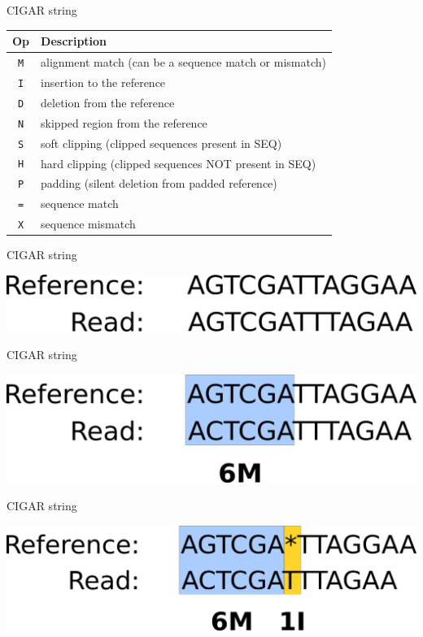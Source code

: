 \documentclass{beamer}
\begin{document}
\begin{frame}{CIGAR string}
  \begin{tabular}{cl}
  \hline
  Op & Description\\
  \hline
  {\tt M} & alignment match (can be a sequence match or mismatch)\\
  {\tt I} & insertion to the reference \\
  {\tt D} & deletion from the reference \\
  {\tt N} & skipped region from the reference \\
  {\tt S} & soft clipping (clipped sequences present in {\sf SEQ})\\
  {\tt H} & hard clipping (clipped sequences NOT present in {\sf SEQ})\\
  {\tt P} & padding (silent deletion from padded reference)\\
  {\tt =} & sequence match \\
  {\tt X} & sequence mismatch \\
  \hline
  \end{tabular}
\end{frame}

\begin{frame}{CIGAR string}
  \begin{center}
    \includegraphics[width=\linewidth, keepaspectratio]{pic/c1.png}
  \end{center}
\end{frame}

\begin{frame}{CIGAR string}
  \begin{center}
    \includegraphics[width=\linewidth, keepaspectratio]{pic/c2.png}
  \end{center}
\end{frame}

\begin{frame}{CIGAR string}
  \begin{center}
    \includegraphics[width=\linewidth, keepaspectratio]{pic/c3.png}
  \end{center}
\end{frame}
\end{document}
